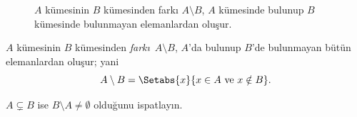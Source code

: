 \begin{figure}
  \caption{$A$ kümesinin $B$ kümesinden farkı $A \setminus B$, $A$
    kümesinde bulunup $B$ kümesinde bulunmayan elemanlardan oluşur.}
\end{figure}

\begin{defn}
$A$ kümesinin $B$ kümesinden \emph{farkı}~$A \setminus B$, $A$'da bulunup
$B$'de bulunmayan bütün elemanlardan oluşur; yani
\[
A\setminus B = \Setabs{x}{x\in A \text{ ve } x \notin B}.
\]
\end{defn}

\begin{prob}
	$A \subsetneq B$ ise $B \setminus A \neq \emptyset$ olduğunu ispatlayın.
\end{prob}

